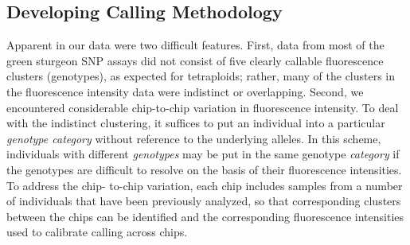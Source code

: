 \subsection{Developing Calling Methodology}
Apparent in our data were two difficult features. First, data from most of the green sturgeon SNP
assays did not consist of five clearly callable
fluorescence clusters (genotypes), as expected for tetraploids; rather, many of
the clusters in the fluorescence intensity data were indistinct or overlapping.
Second, we encountered considerable chip-to-chip variation in fluorescence
intensity. To deal with the indistinct clustering, it suffices to put an
individual into a particular {\em genotype category} without reference to the
underlying alleles. In this scheme, individuals with different {\em genotypes} may be put in the
same genotype {\em category} if the genotypes are difficult to resolve on
the basis of their fluorescence intensities. To address the chip- to-chip
variation, each chip includes samples from a number of individuals that have
been previously analyzed, so that corresponding clusters between the chips can
be identified and the corresponding fluorescence intensities used to calibrate calling across chips.


